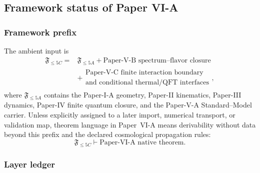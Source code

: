 \documentclass[12pt,a4paper]{article}
\begin{document}
\subsection{Framework status of Paper VI-A}
\label{p8:sec:intro}

\subsubsection{Framework prefix}
\label{p8:subsec:framework-prefix}

The ambient input is
\begin{equation}
\label{p8:eq:framework-prefix}
\begin{aligned}
\mathfrak F_{\le5C}
={}&\mathfrak F_{\le5A}
+\text{Paper-V-B spectrum--flavor closure}\\
&+\begin{gathered}
\text{Paper-V-C finite interaction boundary}\\
\text{and conditional thermal/QFT interfaces}
\end{gathered},
\end{aligned}
\end{equation}
where \(\mathfrak F_{\le5A}\) contains the Paper-I-A geometry, Paper-II kinematics, Paper-III dynamics, Paper-IV finite quantum closure, and the Paper-V-A Standard--Model carrier.  Unless explicitly assigned to a later import, numerical transport, or validation map, theorem language in Paper~VI-A means derivability without data beyond this prefix and the declared cosmological propagation rules:
\begin{equation}
\label{p8:eq:theorem-scope-convention}
\mathfrak F_{\le5C}\vdash \text{Paper-VI-A native theorem}.
\end{equation}

\subsubsection{Layer ledger}
\label{p8:subsec:layer-ledger}
\end{document}

